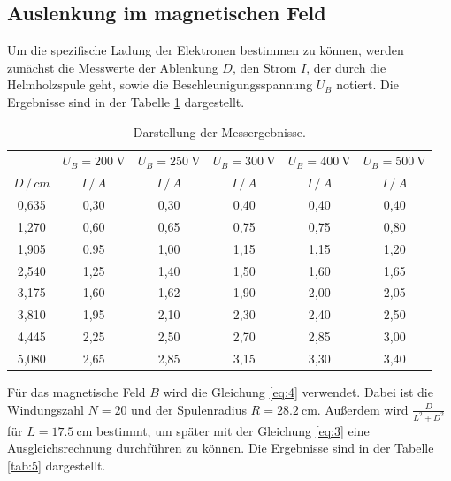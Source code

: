 \subsection{Auslenkung im magnetischen Feld}
Um die spezifische Ladung der Elektronen bestimmen zu können, werden zunächst
die Messwerte der Ablenkung $D$, den Strom $I$, der durch die Helmholzspule geht, sowie die
Beschleunigungsspannung $U_B$ notiert.
Die Ergebnisse sind in der Tabelle \ref{tab:4} dargestellt.
\begin{table}[H]
  \centering
  \caption{Darstellung der Messergebnisse.}
  \label{tab:4}
  \begin{tabular}{c c c c c c}
\toprule
& \multicolumn{1}{c}{$U_B=\SI{200}{\volt}$} & \multicolumn{1}{c}{$U_B=\SI{250}{\volt}$} &\multicolumn{1}{c}{$U_B=\SI{300}{\volt}$}&\multicolumn{1}{c}{$U_B=\SI{400}{\volt}$}&\multicolumn{1}{c}{$U_B=\SI{500}{\volt}$}\\
\cmidrule(lr){2-2}\cmidrule(lr){3-3}\cmidrule(lr){4-4}\cmidrule(lr){5-5}\cmidrule(lr){6-6}
$D \, / \, cm$ & $I \, / \, A$ & $I \, / \, A$ & $I \, / \, A$ &$I \, / \, A$ & $I \, / \, A$\\
\midrule
0,635 & 0,30  & 0,30 & 0,40 & 0,40& 0,40\\
1,270 & 0,60  & 0,65 & 0,75 & 0,75& 0,80\\
1,905 & 0.95  & 1,00 & 1,15 & 1,15& 1,20\\
2,540 & 1,25  & 1,40 & 1,50 & 1,60& 1,65\\
3,175 & 1,60  & 1,62 & 1,90 & 2,00& 2,05\\
3,810 & 1,95  & 2,10 & 2,30 & 2,40& 2,50\\
4,445 & 2,25  & 2,50 & 2,70 & 2,85& 3,00\\
5,080 & 2,65  & 2,85 & 3,15 & 3,30& 3,40\\
\bottomrule
  \end{tabular}
\end{table}
Für das magnetische Feld $B$ wird die Gleichung \ref{eq:4} verwendet. Dabei ist die
Windungszahl $N = 20 $ und der Spulenradius $R = \SI{28.2}{\centi\meter}$.
Außerdem wird $\frac{D}{L^2+D^2}$ für $L = \SI{17.5}{\centi\meter}$ bestimmt, um später
mit der Gleichung \ref{eq:3} eine Ausgleichsrechnung durchführen zu können.
Die Ergebnisse sind in der Tabelle \ref{tab:5} dargestellt.
